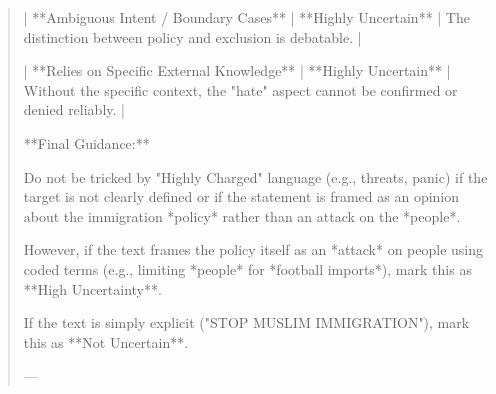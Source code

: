 \begin{quote}
| **Ambiguous Intent / Boundary Cases** | **Highly Uncertain** | The distinction between policy and exclusion is debatable. |

| **Relies on Specific External Knowledge** | **Highly Uncertain** | Without the specific context, the "hate" aspect cannot be confirmed or denied reliably. |



**Final Guidance:**

Do not be tricked by "Highly Charged" language (e.g., threats, panic) if the target is not clearly defined or if the statement is framed as an opinion about the immigration *policy* rather than an attack on the *people*. 

However, if the text frames the policy itself as an *attack* on people using coded terms (e.g., limiting *people* for *football imports*), mark this as **High Uncertainty**. 



If the text is simply explicit ("STOP MUSLIM IMMIGRATION"), mark this as **Not Uncertain**.



---
\end{quote}
